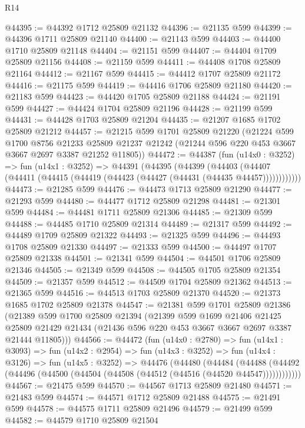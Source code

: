 \begin{lexlean}{R14}
\begin{coremodule}
@44395 := @44392 @1712 @25809 @21132
@44396 := @21135 @599
@44399 := @44396 @1711 @25809 @21140
@44400 := @21143 @599
@44403 := @44400 @1710 @25809 @21148
@44404 := @21151 @599
@44407 := @44404 @1709 @25809 @21156
@44408 := @21159 @599
@44411 := @44408 @1708 @25809 @21164
@44412 := @21167 @599
@44415 := @44412 @1707 @25809 @21172
@44416 := @21175 @599
@44419 := @44416 @1706 @25809 @21180
@44420 := @21183 @599
@44423 := @44420 @1705 @25809 @21188
@44424 := @21191 @599
@44427 := @44424 @1704 @25809 @21196
@44428 := @21199 @599
@44431 := @44428 @1703 @25809 @21204
@44435 := @21207 @1685 @1702 @25809 @21212
@44457 := @21215
    @599
    @1701
    @25809
    @21220
    (@21224
      @599
      @1700
      @8756
      @21233
      @25809
      @21237
      @21242
      (@21244 @596 @220 @453 @3667 @3667 @2697 @3387 @21252 @11805))
@44472 := @44387
    (fun (u14x0 : @3252) =>
    fun (u14x1 : @3252) =>
    @44391
      (@44395
        (@44399
          (@44403 (@44407 (@44411 (@44415 (@44419 (@44423 (@44427 (@44431 (@44435 @44457))))))))))))
@44473 := @21285 @599
@44476 := @44473 @1713 @25809 @21290
@44477 := @21293 @599
@44480 := @44477 @1712 @25809 @21298
@44481 := @21301 @599
@44484 := @44481 @1711 @25809 @21306
@44485 := @21309 @599
@44488 := @44485 @1710 @25809 @21314
@44489 := @21317 @599
@44492 := @44489 @1709 @25809 @21322
@44493 := @21325 @599
@44496 := @44493 @1708 @25809 @21330
@44497 := @21333 @599
@44500 := @44497 @1707 @25809 @21338
@44501 := @21341 @599
@44504 := @44501 @1706 @25809 @21346
@44505 := @21349 @599
@44508 := @44505 @1705 @25809 @21354
@44509 := @21357 @599
@44512 := @44509 @1704 @25809 @21362
@44513 := @21365 @599
@44516 := @44513 @1703 @25809 @21370
@44520 := @21373 @1685 @1702 @25809 @21378
@44547 := @21381
    @599
    @1701
    @25809
    @21386
    (@21389
      @599
      @1700
      @25809
      @21394
      (@21399
        @599
        @1699
        @21406
        @21425
        @25809
        @21429
        @21434
        (@21436 @596 @220 @453 @3667 @3667 @2697 @3387 @21444 @11805)))
@44566 := @44472
    (fun (u14x0 : @2780) =>
    fun (u14x1 : @3093) =>
    fun (u14x2 : @2954) =>
    fun (u14x3 : @3252) =>
    fun (u14x4 : @3126) =>
    fun (u14x5 : @3252) =>
    @44476
      (@44480
        (@44484
          (@44488 (@44492 (@44496 (@44500 (@44504 (@44508 (@44512 (@44516 (@44520 @44547))))))))))))
@44567 := @21475 @599
@44570 := @44567 @1713 @25809 @21480
@44571 := @21483 @599
@44574 := @44571 @1712 @25809 @21488
@44575 := @21491 @599
@44578 := @44575 @1711 @25809 @21496
@44579 := @21499 @599
@44582 := @44579 @1710 @25809 @21504

\end{coremodule}
\end{lexlean}

